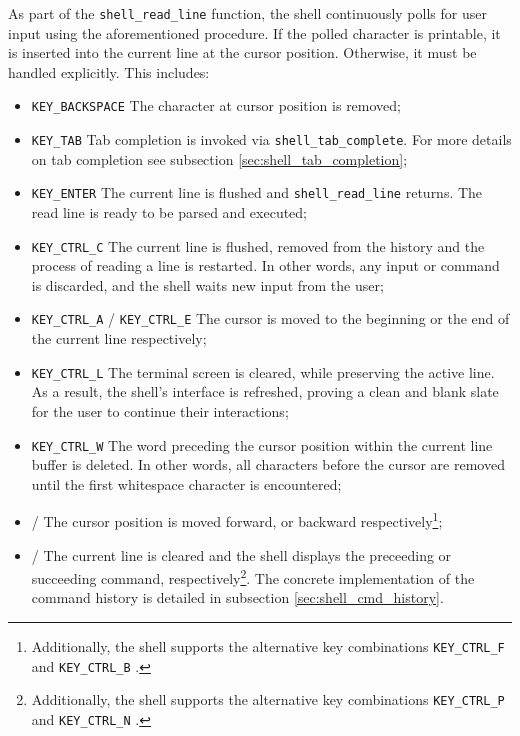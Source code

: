 As part of the \texttt{shell\_read\_line} function, the shell continuously polls for user input using the aforementioned procedure. If the polled character is printable, it is inserted into the current line at the cursor position. Otherwise, it must be handled explicitly. This includes:
\begin{itemize}
	\item \texttt{KEY\_BACKSPACE} \keys{\backspace} The character at cursor position is removed;
	\item \texttt{KEY\_TAB} \keys{\tab} Tab completion is invoked via \texttt{shell\_tab\_complete}. For more details on tab completion see subsection \ref{sec:shell_tab_completion};
	\item \texttt{KEY\_ENTER} \keys{\return} The current line is flushed and \texttt{shell\_read\_line} returns. The read line is ready to be parsed and executed;
	\item \texttt{KEY\_CTRL\_C}  The current line is flushed, removed from the history and the process of reading a line is restarted. In other words, any input or command is discarded, and the shell waits new input from the user;
	\item \texttt{KEY\_CTRL\_A}  / \texttt{KEY\_CTRL\_E}  The cursor is moved to the beginning or the end of the current line respectively;
	\item \texttt{KEY\_CTRL\_L}  The terminal screen is cleared, while preserving the active line. As a result, the shell's interface is refreshed, proving a clean and blank slate for the user to continue their interactions;
	\item \texttt{KEY\_CTRL\_W}  The word preceding the cursor position within the current line buffer is deleted. In other words, all characters before the cursor are removed until the first whitespace character is encountered;
	\item \keys{\arrowkeyright} / \keys{\arrowkeyleft} The cursor position is moved forward, or backward respectively\footnote{Additionally, the shell supports the alternative key combinations \texttt{KEY\_CTRL\_F}  and \texttt{KEY\_CTRL\_B} .};
	\item \keys{\arrowkeyup} / \keys{\arrowkeydown} The current line is cleared and the shell displays the preceeding or succeeding command, respectively\footnote{Additionally, the shell supports the alternative key combinations \texttt{KEY\_CTRL\_P}  and \texttt{KEY\_CTRL\_N} .}. The concrete implementation of the command history is detailed in subsection \ref{sec:shell_cmd_history}.
\end{itemize}


